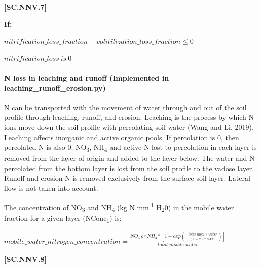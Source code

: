             {\raggedleft \textbf{[SC.NNV.7]}\par}
            \vspace{0.5cm}

        \textbf{If:}
            
    \begin{center}
 \(nitrification\_loss\_fraction+volitilization\_loss\_fraction \leq 0 \)
 \vspace{0.1cm}

 \(nitrification\_loss\ is\ 0 \)
    \end{center}
        \vspace{0.5cm}

\paragraph{N loss in leaching and runoff (Implemented in leaching\_runoff\_erosion.py)}
N can be transported with the movement of water through and out of the soil profile through leaching, runoff, and erosion.  Leaching is the process by which N ions move down the soil profile with percolating soil water (Wang and Li, 2019). Leaching affects inorganic and active organic pools.  If percolation is 0, then percolated N is also 0. NO\textsubscript{3}, NH\textsubscript{4} and active N lost to percolation in each layer is removed from the layer of origin and added to the layer below. The water and N percolated from the bottom layer is lost from the soil profile to the vadose layer. Runoff and erosion N is removed exclusively from the surface soil layer. Lateral flow is not taken into account.
\vspace{0.2cm}

The concentration of NO\textsubscript{3} and NH\textsubscript{4} (kg N mm\textsuperscript{-1} H\textsubscript{2}0) in the mobile water fraction for a given layer (NConc\textsubscript{1}) is: 
\vspace{0.5cm}
            
    \begin{center}
 \(mobile\_water\_nitrogen\_concentration=\frac{NO_3\ or\ NH_4 * [1-exp(\frac{-total\_mobile\_water}{(1- \theta) * SAT})]}{total\_mobile\_water} \)
    \end{center}
        \vspace{0.5cm} 
    
            {\raggedleft \textbf{[SC.NNV.8]}\par}
            \vspace{0.5cm}

